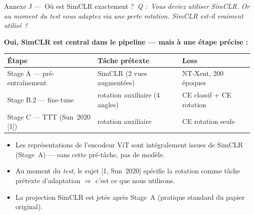 \documentclass[10pt,aspectratio=169]{beamer}
\newcommand{\qbox}[1]{\textit{\textcolor{accent}{Q : #1}}\par\smallskip}
\begin{document}
\begin{frame}{Annexe J --- \guillemotleft\,Où est SimCLR exactement ?\,\guillemotright{}}
  \qbox{\guillemotleft\,Vous deviez utiliser SimCLR. Or au moment du test vous adaptez via une perte rotation. SimCLR est-il vraiment utilisé ?\,\guillemotright{}}

  \textbf{Oui, SimCLR est central dans le pipeline --- mais à une étape précise :}

  \vspace{0.4em}
  \centering
  \small
  \begin{tabular}{lll}
    \toprule
    Étape & Tâche prétexte & Loss \\
    \midrule
    Stage A --- pré-entraînement     & \alert{SimCLR} (2 vues augmentées) & \alert{NT-Xent}, 200 époques \\
    Stage B.2 --- fine-tune          & rotation auxiliaire (4 angles)     & CE classif + CE rotation \\
    Stage C --- TTT (Sun~2020 [1])   & rotation auxiliaire                 & CE rotation seule \\
    \bottomrule
  \end{tabular}

  \vspace{0.6em}
  \begin{itemize}\small
    \item Les représentations de l'encodeur ViT sont \alert{intégralement issues de SimCLR} (Stage~A) --- sans cette pré-tâche, pas de modèle.
    \item Au moment du \emph{test}, le sujet [1, Sun~2020] spécifie la rotation comme tâche prétexte d'adaptation $\Rightarrow$ c'est ce que nous utilisons.
    \item La projection SimCLR est jetée après Stage~A (pratique standard du papier original).
  \end{itemize}
\end{frame}
\end{document}
